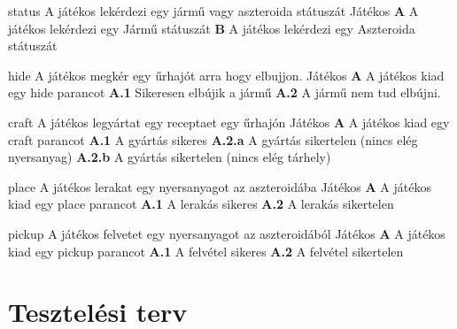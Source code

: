 \documentclass[../../projlab]{subfiles}
\begin{document}
\begin{use-case}
    {status}
    {A játékos lekérdezi egy jármű vagy aszteroida státuszát}
    {Játékos} 
    \textbf{A} A játékos lekérdezi egy Jármű státuszát \newline
    \textbf{B} A játékos lekérdezi egy Aszteroida státuszát
\end{use-case}

\begin{use-case}
    {hide}
    {A játékos megkér egy űrhajót arra hogy elbujjon.}
    {Játékos} 
    \textbf{A} A játékos kiad egy hide parancot \newline
    \textbf{A.1} Sikeresen elbújik a jármű \newline
    \textbf{A.2} A jármű nem tud elbújni.
\end{use-case}

\begin{use-case}
    {craft}
    {A játékos legyártat egy receptaet egy űrhajón}
    {Játékos} 
    \textbf{A} A játékos kiad egy craft parancot \newline
    \textbf{A.1} A gyártás sikeres \newline
    \textbf{A.2.a} A gyártás sikertelen (nincs elég nyersanyag)
    \textbf{A.2.b} A gyártás sikertelen (nincs elég tárhely)
\end{use-case}

\begin{use-case}
    {place}
    {A játékos lerakat egy nyersanyagot az aszteroidába}
    {Játékos} 
    \textbf{A} A játékos kiad egy place parancot \newline
    \textbf{A.1} A lerakás sikeres \newline
    \textbf{A.2} A lerakás sikertelen 
\end{use-case}

\begin{use-case}
    {pickup}
    {A játékos felvetet egy nyersanyagot az aszteroidából}
    {Játékos} 
    \textbf{A} A játékos kiad egy pickup parancot \newline
    \textbf{A.1} A felvétel sikeres \newline
    \textbf{A.2} A felvétel sikertelen 
\end{use-case}


\section{Tesztelési terv}
\end{document}
